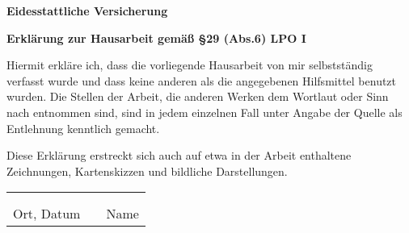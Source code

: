 {\Large \textbf{Eidesstattliche Versicherung}}

\textbf{Erklärung zur Hausarbeit gemäß §29 (Abs.6) LPO I}

Hiermit erkläre ich, dass die vorliegende Hausarbeit von mir selbstständig verfasst wurde und dass keine anderen als die angegebenen Hilfsmittel benutzt wurden. Die Stellen der Arbeit, die anderen Werken dem Wortlaut oder Sinn nach entnommen sind, sind in jedem einzelnen Fall unter Angabe der Quelle als Entlehnung kenntlich gemacht. 

Diese Erklärung erstreckt sich auch auf etwa in der Arbeit enthaltene Zeichnungen, Kartenskizzen und bildliche Darstellungen. 

\vspace{2cm}

\begin{tabular}{lcl}
    \hspace{5cm} & \hspace{2cm} & \hspace{7cm} \\
    \dotfill & & \dotfill \\
    Ort, Datum & & Name
\end{tabular}
